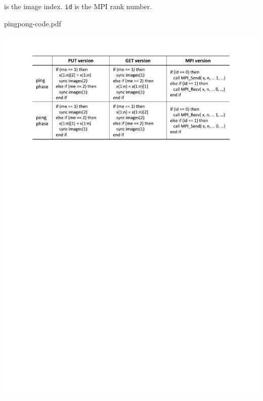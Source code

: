 \begin{table}[bht]
  { is the image index. {\tt id} is the MPI rank number.}\\
  \begin{center}
    \caption{pingpong-code.pdf}\label{tab:pingpong-code}
    \mbox{\includegraphics[trim=24mm 211mm 24mm 16mm, scale=0.7,clip]{figs/pingpong-code-r2.pdf}}
  \end{center}
\end{table}
%
